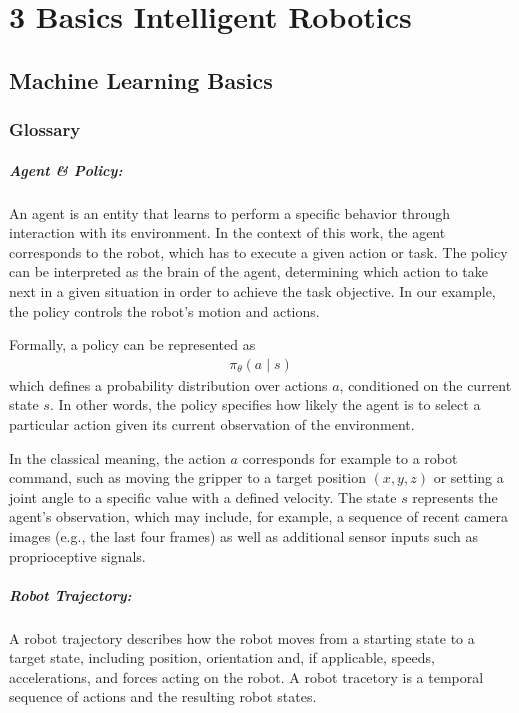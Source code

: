 \chapter{3	Basics Intelligent Robotics}


\section{Machine Learning Basics}
\subsection{Glossary}
\paragraph{Agent \& Policy:}

An agent is an entity that learns to perform a specific behavior through interaction with its environment. In the context of this work, the agent corresponds to the robot, which has to execute a given action or task. The policy can be interpreted as the brain of the agent, determining which action to take next in a given situation in order to achieve the task objective. In our example, the policy controls the robot's motion and actions.  

Formally, a policy can be represented as  
\begin{align}
	\pi_\theta(a \mid s)  
\end{align}
which defines a probability distribution over actions $a$, conditioned on the current state $s$. In other words, the policy specifies how likely the agent is to select a particular action given its current observation of the environment.  

In the classical meaning, the action $a$ corresponds for example to a robot command, such as moving the gripper to a target position $(x, y, z)$ or setting a joint angle to a specific value with a defined velocity. The state $s$ represents the agent’s observation, which may include, for example, a sequence of recent camera images (e.g., the last four frames) as well as additional sensor inputs such as proprioceptive signals.

\paragraph{Robot Trajectory:}

A robot trajectory describes how the robot moves from a starting state to a target state, including position, orientation and, if applicable, speeds, accelerations, and forces acting on the robot. A robot tracetory is a temporal sequence of actions and the resulting robot states.


